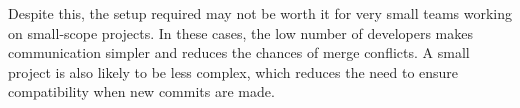 \documentclass{scrartcl}
\begin{document}
Despite this, the setup required may not be worth it for very small teams working on small-scope projects. In these cases, the low number of developers makes communication simpler and reduces the chances of merge conflicts. A small project is also likely to be less complex, which reduces the need to ensure compatibility when new commits are made. 





\end{document}
